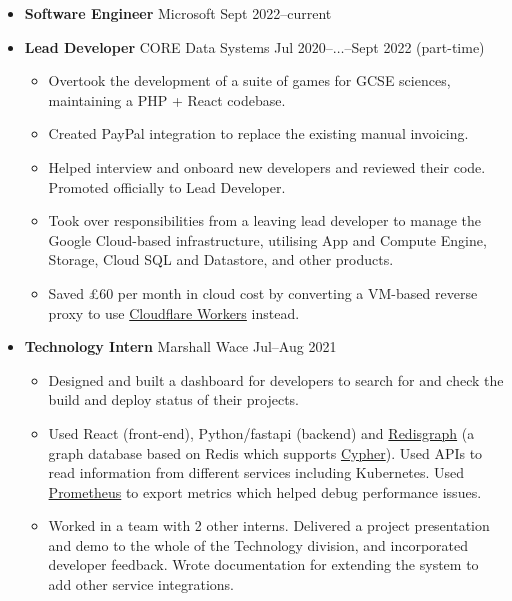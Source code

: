  \begin{itemize}
    \item \textbf{Software Engineer} \dashdiv{} Microsoft \dashdiv{} Sept 2022--current

    \item \textbf{Lead Developer} \dashdiv{} CORE Data Systems \dashdiv{} Jul 2020--$\ldots$--Sept 2022 (part-time)

    \begin{itemize}
      \item Overtook the development of a suite of games for GCSE sciences, maintaining a PHP + React codebase.
      \item Created PayPal integration to replace the existing manual invoicing.
      \item Helped interview and onboard new developers and reviewed their code. Promoted officially to Lead Developer.
      \item Took over responsibilities from a leaving lead developer to manage the Google Cloud-based infrastructure, utilising App and Compute Engine, Storage, Cloud SQL and Datastore, and other products.
      \item Saved £60 per month in cloud cost by converting a VM-based reverse proxy to use \href{https://workers.cloudflare.com/}{\color{link}Cloudflare Workers} instead.
    \end{itemize}

    \item \textbf{Technology Intern} \dashdiv{} Marshall Wace \dashdiv{} Jul--Aug 2021

    \begin{itemize}
      \item Designed and built a dashboard for developers to search for and check the build and deploy status of their projects.
      \item Used React (front-end), Python/fastapi (backend) and \href{https://oss.redis.com/redisgraph/}{\color{link}Redisgraph} (a graph database based on Redis which supports \href{https://neo4j.com/developer/cypher/}{\color{link}Cypher}). Used APIs to read information from different services including Kubernetes. Used \href{https://prometheus.io/}{\color{link}Prometheus} to export metrics which helped debug performance issues.
      \item Worked in a team with 2 other interns. Delivered a project presentation and demo to the whole of the Technology division, and incorporated developer feedback. Wrote documentation for extending the system to add other service integrations.
    \end{itemize}

  \end{itemize}

